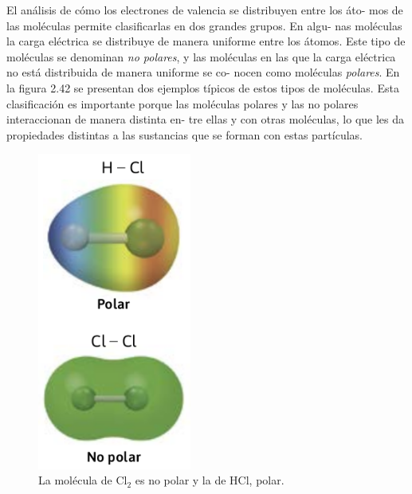 \documentclass[12pt,addpoints,answers]{guia}
\begin{document}
\begin{tcolorbox}[enhanced,attach boxed title to top center={yshift=-3mm,yshifttext=-1mm},
        colback=blue!5!white,colframe=blue!75!black,colbacktitle=red!80!black,
        title=Polaridad molecular,fonttitle=\bfseries,
        boxed title style={size=small,colframe=red!50!black} ]
    El análisis de cómo los electrones de valencia se distribuyen entre los áto-
    mos de las moléculas permite clasificarlas en dos grandes grupos. En algu-
    nas moléculas la carga eléctrica se distribuye de manera uniforme entre los
    átomos. Este tipo de moléculas se denominan \emph{no polares}, y las moléculas
    en las que la carga eléctrica no está distribuida de manera uniforme se co-
    nocen como moléculas \emph{polares}. En la figura 2.42 se presentan dos ejemplos
    típicos de estos tipos de moléculas. Esta clasificación es importante porque
    las moléculas polares y las no polares interaccionan de manera distinta en-
    tre ellas y con otras moléculas, lo que les da propiedades distintas a las
    sustancias que se forman con estas partículas.
    \begin{figure}[H]
        \includegraphics[width=0.45\textwidth]{../images/20230321055533}
        \caption{La molécula de Cl$_2$ es no polar y la de HCl, polar.}
        \label{fig:20230321055533}
    \end{figure}
    \begin{figure}[H]

\end{figure}
\end{tcolorbox}
\end{document}
